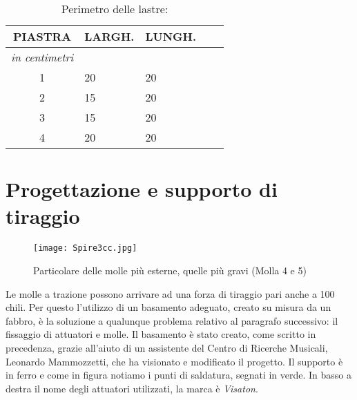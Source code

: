 \begin{table}[htp]
\caption{Perimetro delle lastre:}
\begin{center}

\begin{tabular}{cp{2cm}p{2cm}p{.2cm}p{2cm}} \textbf{PIASTRA}&\textbf{LARGH.}&\textbf{LUNGH.}\\
\hline \textit{in centimetri} \\
\hline 1&20&20\\
\hline 2&15&20\\
\hline 3&15&20\\
\hline 4&20&20\\
\end{tabular}

\end{center}
\label{default}
\end{table}%


\section{Progettazione e supporto di tiraggio}


\begin{figure}[htbp]
\begin{center}
\texttt{[image: Spire3cc.jpg]}
\caption{Particolare delle molle più esterne, quelle più gravi (Molla 4 e 5)}
\label{default}
\end{center}
\end{figure}

Le molle a trazione possono arrivare ad una forza di tiraggio pari anche a 100 chili. Per questo l'utilizzo di un basamento adeguato, creato su misura da un fabbro, è la soluzione a qualunque problema relativo al paragrafo successivo: il fissaggio di attuatori e molle.
Il basamento è stato creato, come scritto in precedenza, grazie all'aiuto di un assistente del Centro di Ricerche Musicali, Leonardo Mammozzetti, che ha visionato e modificato il progetto. Il supporto è in ferro e come in figura \label{fig:basamento} notiamo i punti di saldatura, segnati in verde. In basso a destra il nome degli attuatori utilizzati, la marca è \emph{Visaton}.

